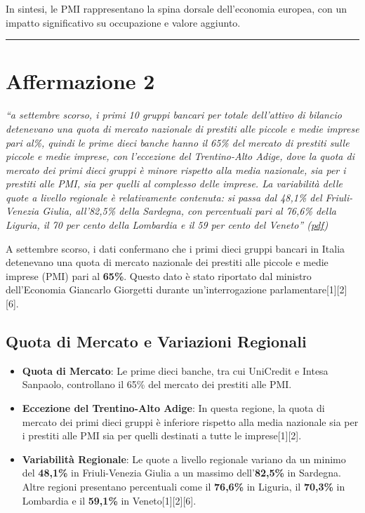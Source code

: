 \documentclass[
  letterpaper,
  DIV=11,
  numbers=noendperiod]{scrartcl}
\providecommand{\tightlist}{%
  \setlength{\itemsep}{0pt}\setlength{\parskip}{0pt}}\usepackage{longtable,booktabs,array}
\begin{document}
In sintesi, le PMI rappresentano la spina dorsale dell'economia europea,
con un impatto significativo su occupazione e valore aggiunto.

\begin{center}\rule{0.5\linewidth}{0.5pt}\end{center}

\section{Affermazione 2}\label{affermazione-2}

\emph{``a settembre scorso, i primi 10 gruppi bancari per totale
dell'attivo di bilancio detenevano una quota di mercato nazionale di
prestiti alle piccole e medie imprese pari al\%, quindi le prime dieci
banche hanno il 65\% del mercato di prestiti sulle piccole e medie
imprese, con l'eccezione del Trentino-Alto Adige, dove la quota di
mercato dei primi dieci gruppi è minore rispetto alla media nazionale,
sia per i prestiti alle PMI, sia per quelli al complesso delle imprese.
La variabilità delle quote a livello regionale è relativamente
contenuta: si passa dal 48,1\% del Friuli-Venezia Giulia, all'82,5\%
della Sardegna, con percentuali pari al 76,6\% della Liguria, il 70 per
cento della Lombardia e il 59 per cento del Veneto''
(\href{zotero://open-pdf/library/items/B4RMZ7B3?page=1&annotation=T4DLE8D4}{pdf})}

A settembre scorso, i dati confermano che i primi dieci gruppi bancari
in Italia detenevano una quota di mercato nazionale dei prestiti alle
piccole e medie imprese (PMI) pari al \textbf{65\%}. Questo dato è stato
riportato dal ministro dell'Economia Giancarlo Giorgetti durante
un'interrogazione parlamentare{[}1{]}{[}2{]}{[}6{]}.

\subsection{Quota di Mercato e Variazioni
Regionali}\label{quota-di-mercato-e-variazioni-regionali}

\begin{itemize}
\tightlist
\item
  \textbf{Quota di Mercato}: Le prime dieci banche, tra cui UniCredit e
  Intesa Sanpaolo, controllano il 65\% del mercato dei prestiti alle
  PMI.
\item
  \textbf{Eccezione del Trentino-Alto Adige}: In questa regione, la
  quota di mercato dei primi dieci gruppi è inferiore rispetto alla
  media nazionale sia per i prestiti alle PMI sia per quelli destinati a
  tutte le imprese{[}1{]}{[}2{]}.
\item
  \textbf{Variabilità Regionale}: Le quote a livello regionale variano
  da un minimo del \textbf{48,1\%} in Friuli-Venezia Giulia a un massimo
  dell'\textbf{82,5\%} in Sardegna. Altre regioni presentano percentuali
  come il \textbf{76,6\%} in Liguria, il \textbf{70,3\%} in Lombardia e
  il \textbf{59,1\%} in Veneto{[}1{]}{[}2{]}{[}6{]}.
\end{itemize}
\end{document}
